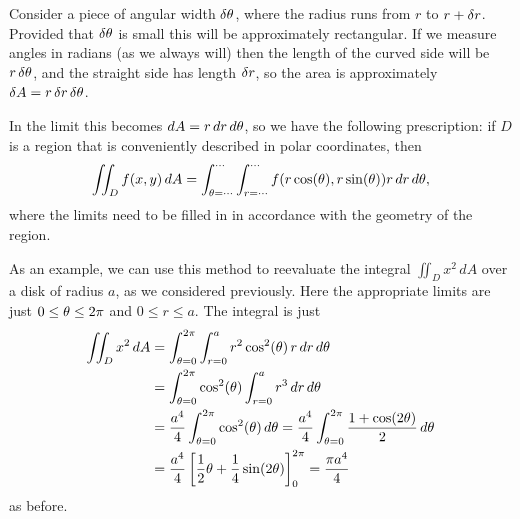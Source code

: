 \documentclass[reqno]{amsart}
\theoremstyle{definition}
\begin{document}
Consider a piece of angular width $\delta\theta$, where the radius runs
from $r$ to $r+\delta r$.  Provided that $\delta\theta$ is small this will be
approximately rectangular.  If we measure angles in radians (as we
always will) then the length of the curved side will be $r\,\delta\theta$,
and the straight side has length $\delta r$, so the area is approximately
$\delta A=r\,\delta r\,\delta\theta$.
\begin{center}
\end{center}
In the limit this becomes $dA=r\,dr\,d\theta$, so we have the following
prescription: if $D$ is a region that is conveniently described in
polar coordinates, then
\[ \iint_D f(x,y)\,dA =
    \int_{\theta=\dotsb}^{\dotsb} \int_{r=\dotsb}^{\dotsb} 
     f(r\cos(\theta),r\sin(\theta)) r\,dr\,d\theta,
\]
where the limits need to be filled in in accordance with the geometry
of the region.

As an example, we can use this method to reevaluate the integral
$\iint_Dx^2\,dA$ over a disk of radius $a$, as we considered
previously.  Here the appropriate limits are just $0\leq\theta\leq 2\pi$
and $0\leq r\leq a$.  The integral is just
\begin{align*}
 \iint_D x^2\,dA &=
  \int_{\azi=0}^{2\pi} \int_{r=0}^a r^2\cos^2(\azi)\,r\,dr\,d\azi \\
  &= \int_{\azi=0}^{2\pi} \cos^2(\azi) \int_{r=0}^a r^3\,dr\,d\azi \\
  &= \frac{a^4}{4} \int_{\azi=0}^{2\pi} \cos^2(\azi)\,d\azi 
   = \frac{a^4}{4} \int_{\azi=0}^{2\pi} \frac{1+\cos(2\azi)}{2}\,d\azi \\
  &= \frac{a^4}{4} \CH{\frac{1}{2}\azi + \frac{1}{4}\sin(2\azi)}_0^{2\pi} 
   = \frac{\pi a^4}{4}
\end{align*}
as before.
\end{document}
